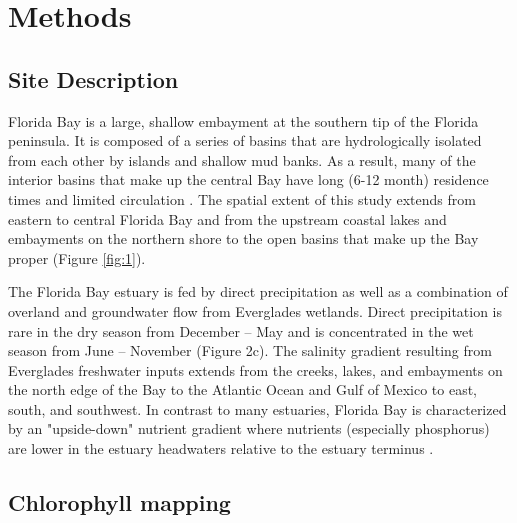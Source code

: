 \section{Methods}
\label{methods}
\subsection{Site Description}
\label{sitedescription}
Florida Bay is a large, shallow embayment at the southern tip of the Florida peninsula. It is composed of a series of basins that are hydrologically isolated from each other by islands and shallow mud banks. As a result, many of the interior basins that make up the central Bay have long (6-12 month) residence times and limited circulation \citep{lee2016circulation}. The spatial extent of this study extends from eastern to central Florida Bay and from the upstream coastal lakes and embayments on the northern shore to the open basins that make up the Bay proper (Figure \ref{fig:1}). 

The Florida Bay estuary is fed by direct precipitation as well as  a combination of overland and groundwater flow from Everglades wetlands. Direct precipitation is rare in the dry season from December – May and is concentrated in the wet season from June – November (Figure 2c). The salinity gradient resulting from Everglades freshwater inputs extends from the creeks, lakes, and embayments on the north edge of the Bay to the Atlantic Ocean and Gulf of Mexico to east, south, and southwest. In contrast to many estuaries, Florida Bay is characterized by an "upside-down" nutrient gradient where nutrients (especially phosphorus) are lower in the estuary headwaters relative to the estuary terminus \citep{childers_relating_2006}.

\subsection{Chlorophyll mapping}
\label{chlmapping}

